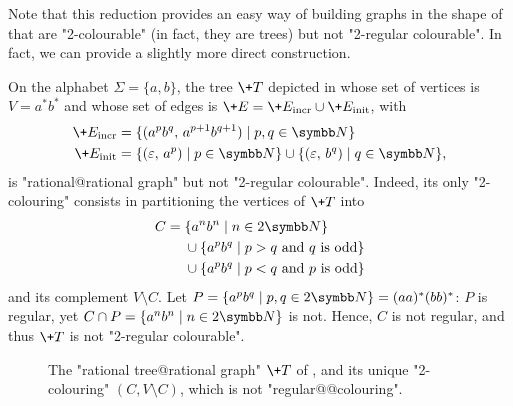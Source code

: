 Note that this reduction provides an easy way of building
graphs in the shape of  that are "2-colourable" (in fact, they are trees) but not "2-regular colourable". In fact, we can provide a slightly more
direct construction.

\begin{example}
    \AP\label{ex:tree-not-2-reg-colourable}
    On the alphabet $\Sigma = \{a,b\}$, the tree $\+T$ depicted in  whose set of vertices is $V = a^*b^*$ and whose set 
    of edges is $\+E = \+E_{\mathrm{incr}} \cup \+E_{\mathrm{init}}$, with 
    \begin{align*}
        \+E_{\mathrm{incr}} & = \{(a^pb^q,\, a^{p+1}b^{q+1}) \mid p,q \in \N\} \\
        \+E_{\mathrm{init}} & = \{(\varepsilon,\, a^p) \mid p \in \N\} \cup \{(\varepsilon,\, b^q) \mid q \in \N\}, 
    \end{align*}    
    is "rational@rational graph" but not "2-regular colourable".
    Indeed, its only "2-colouring"
    consists in partitioning the vertices of $\+T$ into
    \begin{align*}
        C =\;& \{a^n b^n \mid n \in 2\N\} \\
            & \cup \{a^p b^q \mid p > q \text{ and $q$ is odd}\} \\
            & \cup \{a^p b^q \mid p < q \text{ and $p$ is odd}\}
    \end{align*}
    and its complement $V \setminus C$.
    Let $P = \{a^p b^q \mid p, q \in 2\N\} = (aa)^*(bb)^*$:
    $P$ is regular, yet $C \cap P = \{a^n b^n \mid n \in 2\N\}$ is not.
    Hence, $C$ is not regular, and thus $\+T$ is not "2-regular colourable".
\end{example}

\begin{figure}
    \centering
    \begin{tikzpicture}
        
    \end{tikzpicture}
    \caption{
        \label{fig:tree-not-2reg-colour}
        The "rational tree@rational graph" $\+T$ of ,
        and its unique "2-colouring" $(C, V\setminus C)$, which is not "regular@@colouring".
    }
\end{figure}